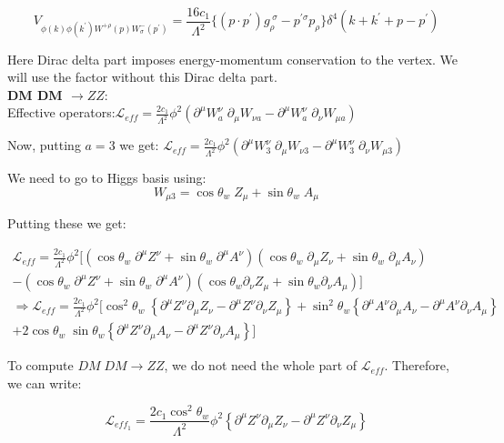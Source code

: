\documentclass[12pt]{report}
\begin{document}
 \begin{equation}
 V_{\phi(k) \phi(k^\prime) W^{+\rho}(p) W^-_\sigma(p^\prime)}= \frac{16c_1}{\Lambda^2} \{(p\cdot p^\prime) g_\rho^{\;\sigma}-p^{\prime \sigma} p_\rho\} \delta^4(k+k^\prime+p-p^\prime) \label{wv}
 \end{equation} 

Here Dirac delta part imposes energy-momentum conservation to the vertex. We will use the factor without this Dirac delta part.\\





\textbf{DM DM $\longrightarrow ZZ$}:\\


Effective operators:$\mathscr{L}_{eff}= \frac{2c_1}{\Lambda^2} \phi^2 (\partial^\mu W^\nu_a\; \partial_\mu W_{\nu a}- \partial^\mu W^\nu_a\; \partial_\nu W_{\mu a})$

Now, putting $a = 3$ we get:
$\mathscr{L}_{eff}= \frac{2c_1}{\Lambda^2} \phi^2 (\partial^\mu W^\nu_3\; \partial_\mu W_{\nu 3}- \partial^\mu W^\nu_3\; \partial_\nu W_{\mu 3})$

We need to go to Higgs basis using:
$$W_{\mu 3} = \cos\theta_w\; Z_\mu +\sin\theta_w\; A_\mu $$

Putting these we get:

\begin{multline}
\mathscr{L}_{eff}=\frac{2c_1}{\Lambda^2} \phi^2 [(\cos\theta_w\; \partial^\mu Z^\nu + \sin\theta_w\; \partial^\mu A^\nu)(\cos\theta_w\; \partial_\mu Z_\nu + \sin\theta_w\; \partial_\mu A_\nu) \\-(\cos\theta_w \; \partial^\mu Z^\nu + \sin\theta_w \; \partial^\mu A^\nu) (\cos\theta_w \partial_\nu Z_\mu +\sin\theta_w \partial_\nu A_\mu ) ] \\
\Rightarrow \mathscr{L}_{eff}=\frac{2c_1}{\Lambda^2} \phi^2 [\cos^2\theta_w\; \left\{ \partial^\mu Z^\nu \partial_\mu Z_\nu- \partial^\mu Z^\nu \partial_\nu Z_\mu \right\}+\sin^2\theta_w \left\{ \partial^\mu A^\nu \partial_\mu A_\nu - \partial^\mu A^\nu \partial_\nu A_\mu  \right\} \\
+2 \cos\theta_w \; \sin\theta_w \left\{ \partial^\mu Z^\nu \partial_\mu A_\nu - \partial^\mu Z^\nu \partial_\nu A_\mu \right\} ]
\end{multline}

To compute $DM\; DM \longrightarrow ZZ$, we do not need the whole part of $\mathscr{L}_{eff}$. Therefore, we can write:

$$\mathscr{L}_{eff_1}=\frac{2c_1\cos^2\theta_w}{\Lambda^2} \phi^2 \left\{ \partial^\mu Z^\nu \partial_\mu Z_\nu- \partial^\mu Z^\nu \partial_\nu Z_\mu \right\}$$
\end{document}
